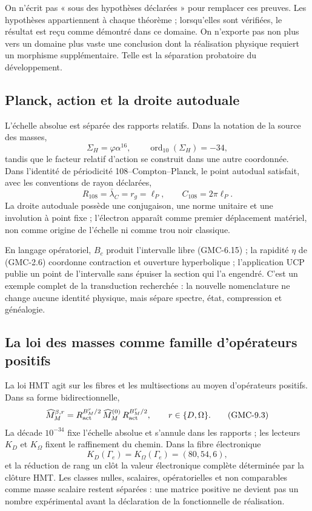 On n'écrit pas « sous des hypothèses déclarées » pour remplacer ces preuves. Les
hypothèses appartiennent à chaque théorème ; lorsqu'elles sont vérifiées, le
résultat est reçu comme démontré dans ce domaine. On n'exporte pas non plus vers un
domaine plus vaste une conclusion dont la réalisation physique requiert un morphisme
supplémentaire. Telle est la séparation probatoire du développement.

\subsection{Planck, action et la droite autoduale}

L'échelle absolue est séparée des rapports relatifs. Dans la notation de la
source des masses,
\[
 \Sigma_H=\varphi\alpha^{16},
 \qquad \operatorname{ord}_{10}(\Sigma_H)=-34,
 \tag{GMC-9.1}
\]
tandis que le facteur relatif d'action se construit dans une autre coordonnée. Dans
l'identité de périodicité 108--Compton--Planck, le point autodual satisfait, avec les
conventions de rayon déclarées,
\[
 R_{108}=\bar\lambda_C=r_g=\ell_P,
 \qquad C_{108}=2\pi\ell_P.
 \tag{GMC-9.2}
\]
La droite autoduale possède une conjugaison, une norme unitaire et une involution à point
fixe ; l'électron apparaît comme premier déplacement matériel, non comme origine
de l'échelle ni comme trou noir classique.

En langage opératoriel, $B_c$ produit l'intervalle libre
\textup{(GMC-6.15)} ; la rapidité $\eta$ de \textup{(GMC-2.6)} coordonne contraction et
ouverture hyperbolique ; l'application UCP publie un point de l'intervalle sans
épuiser la section qui l'a engendré. C'est un exemple complet de la
transduction recherchée : la nouvelle nomenclature ne change aucune identité
physique, mais sépare spectre, état, compression et généalogie.

\subsection{La loi des masses comme famille d'opérateurs positifs}

La loi HMT agit sur les fibres et les multisections au moyen d'opérateurs positifs.
Dans sa forme bidirectionnelle,
\[
 \widehat M_{M}^{\beta,r}
 =R_{\rm act}^{B_M^r/2}\,
  \widehat M_M^{(0)}\,
  R_{\rm act}^{B_M^r/2},
 \qquad r\in\{D,\Omega\}.
 \tag{GMC-9.3}
\]
La décade $10^{-34}$ fixe l'échelle absolue et s'annule dans les rapports ; les
lecteurs $K_D$ et $K_\Omega$ fixent le raffinement du chemin. Dans la fibre
électronique
\[
 K_D(\Gamma_e)=K_\Omega(\Gamma_e)=(80,54,6),
 \tag{GMC-9.4}
\]
et la réduction de rang un clôt la valeur électronique complète déterminée
par la clôture HMT. Les classes nulles, scalaires, opératorielles et non comparables
comme masse scalaire restent séparées : une matrice positive ne devient pas
un nombre expérimental avant la déclaration de la fonctionnelle de réalisation.

